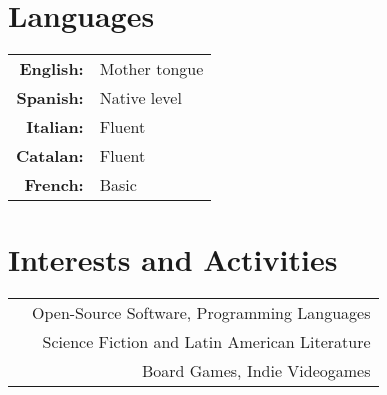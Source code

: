 \documentclass[a4paper,10pt]{article} %
\newcommand*{\justifyheading}{\raggedright}
\begin{document}
\begin{minipage}[t]{0.5\textwidth}
\section{\SC Languages}
\smallskip
\begin{tabular}{rl}
 \textbf{English:} & Mother tongue  \\

 \textbf{Spanish:} & Native level  \\

 \textbf{Italian:} & Fluent  \\

 \textbf{Catalan:} & Fluent  \\

 \textbf{French:} & Basic
\end{tabular}
\end{minipage}\hspace{-0.01\textwidth}
%
%
\begin{minipage}[t]{0.505\textwidth}
\renewcommand{\justifyheading}{\raggedleft}
\section{\SC Interests and Activities}
\smallskip
\begin{tabularx}{\textwidth}{Xr}
& Open-Source Software, Programming Languages\\
& Science Fiction and Latin American Literature \\
& Board Games, Indie Videogames
\end{tabularx}
\end{minipage}



\end{document}
